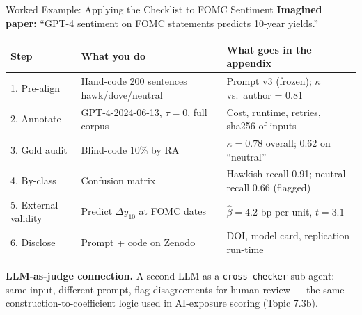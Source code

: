 \begin{frame}{Worked Example: Applying the Checklist to FOMC Sentiment}
\textbf{Imagined paper:} ``GPT-4 sentiment on FOMC statements predicts 10-year yields.''

\medskip
\begin{center}
\renewcommand{\arraystretch}{1.2}
\footnotesize
\begin{tabular}{|p{2.4cm}|p{4.0cm}|p{6.6cm}|}
\hline
\textbf{Step} & \textbf{What you do} & \textbf{What goes in the appendix} \\ \hline
1. Pre-align & Hand-code 200 sentences hawk/dove/neutral & Prompt v3 (frozen); $\kappa$ vs.\ author = 0.81 \\ \hline
2. Annotate & GPT-4-2024-06-13, $\tau=0$, full corpus & Cost, runtime, retries, sha256 of inputs \\ \hline
3. Gold audit & Blind-code 10\% by RA & $\kappa = 0.78$ overall; 0.62 on ``neutral'' \\ \hline
4. By-class & Confusion matrix & Hawkish recall 0.91; neutral recall 0.66 (flagged) \\ \hline
5. External validity & Predict $\Delta y_{10}$ at FOMC dates & $\hat\beta = 4.2$ bp per unit, $t = 3.1$ \\ \hline
6. Disclose & Prompt + code on Zenodo & DOI, model card, replication run-time \\ \hline
\end{tabular}
\end{center}

\medskip
\textbf{LLM-as-judge connection.} A second LLM as a \texttt{cross-checker} sub-agent: same input, different prompt, flag disagreements for human review --- the same construction-to-coefficient logic used in AI-exposure scoring (Topic 7.3b).
\end{frame}

